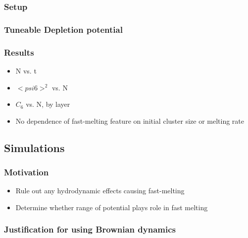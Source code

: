 \documentclass[11pt]{article}
\begin{document}
\subsubsection{Setup}
\label{sec-2-2-1}
\subsubsection{Tuneable Depletion potential}
\label{sec-2-2-2}
\subsubsection{Results}
\label{sec-2-2-3}
\begin{itemize}

\item N vs. t\\
\label{sec-2-2-3-1}%
\item $< psi6 >^2$ vs. N\\
\label{sec-2-2-3-2}%
\item $C_6$ vs. N, by layer\\
\label{sec-2-2-3-3}%
\item No dependence of fast-melting feature on initial cluster size or melting rate\\
\label{sec-2-2-3-4}%
\end{itemize} %
\subsection{Simulations}
\label{sec-2-3}
\subsubsection{Motivation}
\label{sec-2-3-1}
\begin{itemize}

\item Rule out any hydrodynamic effects causing fast-melting\\
\label{sec-2-3-1-1}%
\item Determine whether range of potential plays role in fast melting\\
\label{sec-2-3-1-2}%
\end{itemize} %
\subsubsection{Justification for using Brownian dynamics}
\label{sec-2-3-2}
\end{document}
